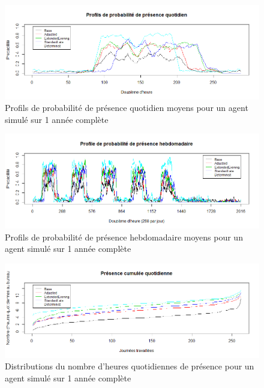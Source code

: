 \begin{figure}
\centering
\includegraphics[scale=0.45]{Images/PageActivities/PresenceQ}
\caption{Profils de probabilité de présence quotidien moyens pour un agent simulé sur 1 année complète}
\label{fig:PresenceQ}
\end{figure}

\begin{figure}
\centering
\includegraphics[scale=0.45]{Images/PageActivities/PresenceH}
\caption{Profils de probabilité de présence hebdomadaire moyens pour un agent simulé sur 1 année complète}
\label{fig:PresenceH}
\end{figure}

\begin{figure}
\centering
\includegraphics[scale=0.45]{Images/PageActivities/PresenceCumulee}
\caption{Distributions du nombre d'heures quotidiennes de présence pour un agent simulé sur 1 année complète}
\label{fig:PresenceCumulee}
\end{figure}

